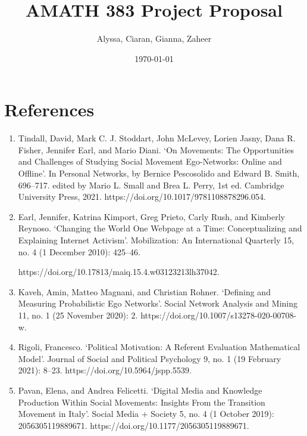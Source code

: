 \documentclass{article}
\title{AMATH 383 Project Proposal}
\author{Alyssa, Ciaran, Gianna, Zaheer}
\date{\today}
\begin{document}
    \maketitle

    \section{References}
    \begin{enumerate}
    \item Tindall, David, Mark C. J. Stoddart, John McLevey, Lorien Jasny, Dana R. Fisher, Jennifer Earl, and Mario Diani. ‘On Movements: The Opportunities and Challenges of Studying Social Movement Ego-Networks: Online and Offline’. In Personal Networks, by Bernice Pescosolido and Edward B. Smith, 696–717. edited by Mario L. Small and Brea L. Perry, 1st ed. Cambridge University Press, 2021.
    https://doi.org/10.1017/9781108878296.054.

    \item Earl, Jennifer, Katrina Kimport, Greg Prieto, Carly Rush, and Kimberly Reynoso. ‘Changing the World One Webpage at a Time: Conceptualizing and Explaining Internet Activism’. Mobilization: An International Quarterly 15, no. 4 (1 December 2010): 425–46. 

    https://doi.org/10.17813/maiq.15.4.w03123213lh37042.

    \item Kaveh, Amin, Matteo Magnani, and Christian Rohner. ‘Defining and Measuring Probabilistic Ego Networks’. Social Network Analysis and Mining 11, no. 1 (25 November 2020): 2. https://doi.org/10.1007/s13278-020-00708-w.

    \item Rigoli, Francesco. ‘Political Motivation: A Referent Evaluation Mathematical Model’. Journal of Social and Political Psychology 9, no. 1 (19 February 2021): 8–23. https://doi.org/10.5964/jspp.5539.

    \item Pavan, Elena, and Andrea Felicetti. ‘Digital Media and Knowledge Production Within Social Movements: Insights From the Transition Movement in Italy’. Social Media + Society 5, no. 4 (1 October 2019): 2056305119889671. https://doi.org/10.1177/2056305119889671.


    \end{enumerate}
\end{document}
